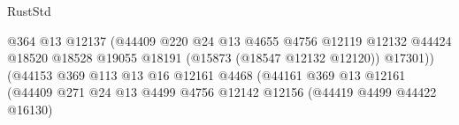 \begin{lexlean}{RustStd}
\begin{coremodule}
                                                            @364
                                                            @13
                                                            @12137
                                                            (@44409
                                                              @220
                                                              @24
                                                              @13
                                                              @4655
                                                              @4756
                                                              @12119
                                                              @12132
                                                              @44424
                                                              @18520
                                                              @18528
                                                              @19055
                                                              @18191
                                                              (@15873 (@18547 @12132 @12120))
                                                              @17301))
                                                          (@44153
                                                            @369
                                                            @113
                                                            @13
                                                            @16
                                                            @12161
                                                            @4468
                                                            (@44161
                                                              @369
                                                              @13
                                                              @12161
                                                              (@44409
                                                                @271
                                                                @24
                                                                @13
                                                                @4499
                                                                @4756
                                                                @12142
                                                                @12156
                                                                (@44419 @4499 @44422 @16130)

\end{coremodule}
\end{lexlean}
